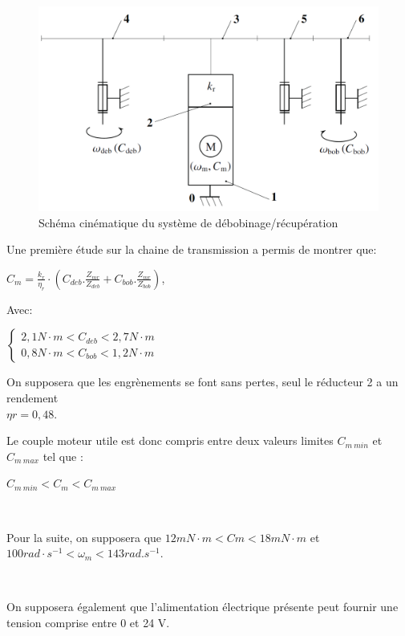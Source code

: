 \newpage

\begin{figure}[!h]
 \centering\includegraphics[width=0.7\linewidth]{img/img06}
 \caption{Schéma cinématique du système de débobinage/récupération}
 \label{img06}
\end{figure}

Une première étude sur la chaine de transmission a permis de montrer que:
\begin{center}
$C_m=\frac{k_r}{\eta_r}\cdot\left(C_{deb}.\frac{Z_{mr}}{Z_{deb}}+C_{bob}.\frac{Z_{mr}}{Z_{bob}}\right)$,
\end{center}


Avec:\\
\begin{center}
$\left\{\begin{array}{c}
2,1 N\cdot m < C_{deb} < 2,7 N\cdot m \\
0,8 N\cdot m < C_{bob} < 1,2 N\cdot m
\end{array}\right.$
\end{center}

On supposera que les engrènements se font sans pertes, seul le réducteur 2 a un rendement \\$\eta r=0,48$.

Le couple moteur utile est donc compris entre deux valeurs limites $C_{m\ min}$ et $C_{m\ max}$ tel que :
\begin{center}
$C_{m\ min} < C_m < C_{m\ max}$
\end{center}


~\

Pour la suite, on supposera que $12 mN\cdot m < Cm < 18 mN\cdot m$ et $100 rad\cdot s^{-1} < \omega_m < 143 rad.s^{-1}$.

~\

On supposera également que l'alimentation électrique présente peut fournir une tension comprise entre 0 et 24 V.

